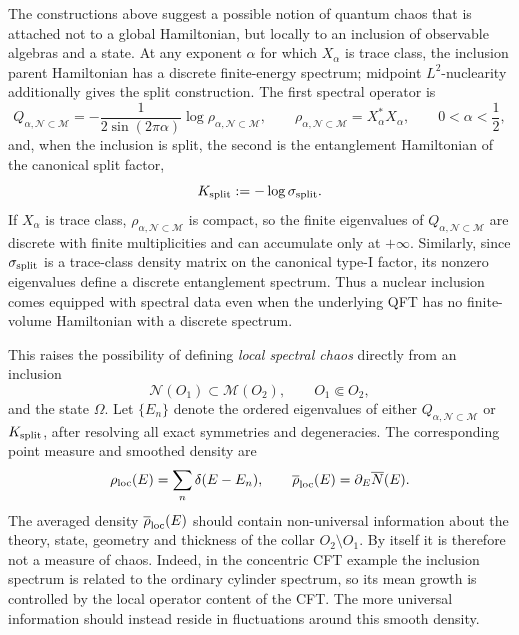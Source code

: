 \documentclass[a4paper,11pt]{article}
\theoremstyle{definition}
\newcommand{\mN}{\mathcal{N}}
\newcommand{\mM}{\mathcal{M}}
\begin{document}
The constructions above suggest a possible notion of quantum chaos that is attached not to a global Hamiltonian, but locally to an inclusion of observable algebras and a state. At any exponent $\alpha$ for which $X_\alpha$ is trace class, the inclusion parent Hamiltonian has a discrete finite-energy spectrum; midpoint $L^2$-nuclearity additionally gives the split construction. The first spectral operator is
\begin{equation}
    Q_{\alpha,\mN\subset\mM}
    =
    -\frac{1}{2\sin(2\pi\alpha)}
    \log\rho_{\alpha,\mN\subset\mM},
    \qquad
    \rho_{\alpha,\mN\subset\mM}=X_\alpha^*X_\alpha,
    \qquad
    0<\alpha<\frac12 ,
    \label{eq:local-chaos-Halpha}
\end{equation}
and, when the inclusion is split, the second is the entanglement Hamiltonian of the canonical split factor,
\begin{equation}
    K_{\rm split}:=-\log\sigma_{\rm split}.
    \label{eq:local-chaos-Ksplit}
\end{equation}
If $X_\alpha$ is trace class, $\rho_{\alpha,\mN\subset\mM}$ is compact, so the finite eigenvalues of $Q_{\alpha,\mN\subset\mM}$ are discrete with finite multiplicities and can accumulate only at $+\infty$.  Similarly, since $\sigma_{\rm split}$ is a trace-class density matrix on the canonical type-I factor, its nonzero eigenvalues define a discrete entanglement spectrum.  Thus a nuclear inclusion comes equipped with spectral data even when the underlying QFT has no finite-volume Hamiltonian with a discrete spectrum.

This raises the possibility of defining \emph{local spectral chaos} directly from an inclusion
\begin{equation}
    \mN(O_1)\subset\mM(O_2),
    \qquad O_1\Subset O_2,
\end{equation}
and the state $\Omega$.  Let $\{E_n\}$ denote the ordered eigenvalues of either
$Q_{\alpha,\mN\subset\mM}$ or $K_{\rm split}$, after resolving all exact symmetries and degeneracies.  The corresponding point measure and smoothed density are
\begin{equation}
    \rho_{\rm loc}(E)
    =
    \sum_n\delta(E-E_n),
    \qquad
    \overline\rho_{\rm loc}(E)
    =
    \partial_E\overline N(E).
    \label{eq:local-density-states}
\end{equation}
The averaged density $\overline\rho_{\rm loc}(E)$ should contain non-universal information about the theory, state, geometry and thickness of the collar $O_2\setminus O_1$.  By itself it is therefore not a measure of chaos.  Indeed, in the concentric CFT example the inclusion spectrum is related to the ordinary cylinder spectrum, so its mean growth is controlled by the local operator content of the CFT.  The more universal information should instead reside in fluctuations around this smooth density.
\end{document}
